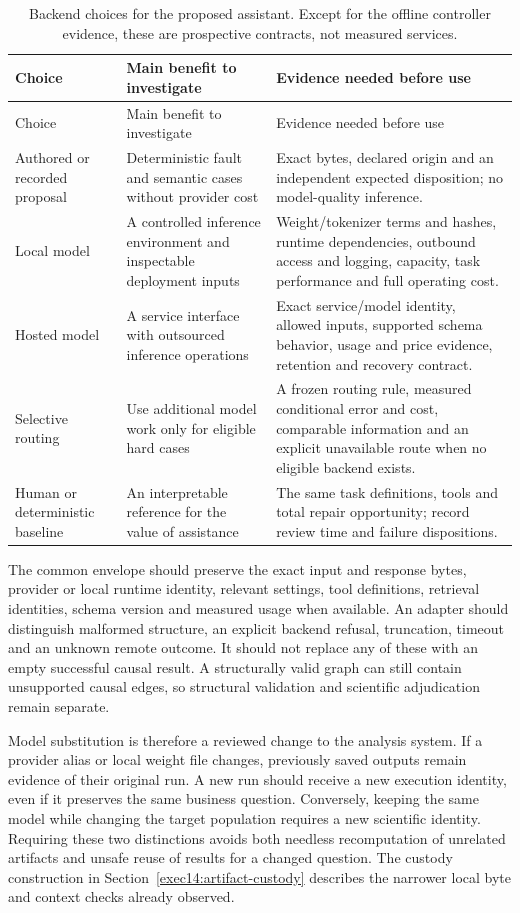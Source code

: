 \begin{longtable}{@{}P{.19\textwidth}P{.34\textwidth}P{.40\textwidth}@{}}
\caption{Backend choices for the proposed assistant. Except for the offline
controller evidence, these are prospective contracts, not measured services.}
\label{exec14:l6-backends}\\
\toprule Choice & Main benefit to investigate & Evidence needed before use\\\midrule
\endfirsthead
\toprule Choice & Main benefit to investigate & Evidence needed before use\\\midrule
\endhead
Authored or recorded proposal & Deterministic fault and semantic cases without
provider cost & Exact bytes, declared origin and an independent expected
disposition; no model-quality inference.\\
Local model & A controlled inference environment and inspectable deployment
inputs & Weight/tokenizer terms and hashes, runtime dependencies, outbound
access and logging, capacity, task performance and full operating cost.\\
Hosted model & A service interface with outsourced inference operations &
Exact service/model identity, allowed inputs, supported schema behavior,
usage and price evidence, retention and recovery contract.\\
Selective routing & Use additional model work only for eligible hard cases &
A frozen routing rule, measured conditional error and cost, comparable
information and an explicit unavailable route when no eligible backend exists.\\
Human or deterministic baseline & An interpretable reference for the value
of assistance & The same task definitions, tools and total repair opportunity;
record review time and failure dispositions.\\
\bottomrule
\end{longtable}

The common envelope should preserve the exact input and response bytes,
provider or local runtime identity, relevant settings, tool definitions,
retrieval identities, schema version and measured usage when available.
An adapter should distinguish malformed structure, an explicit backend
refusal, truncation, timeout and an unknown remote outcome. It should not
replace any of these with an empty successful causal result. A structurally
valid graph can still contain unsupported causal edges, so structural
validation and scientific adjudication remain separate.

Model substitution is therefore a reviewed change to the analysis system.
If a provider alias or local weight file changes, previously saved outputs
remain evidence of their original run. A new run should receive a new
execution identity, even if it preserves the same business question.
Conversely, keeping the same model while changing the target population
requires a new scientific identity. Requiring these two distinctions avoids
both needless recomputation of unrelated artifacts and unsafe reuse of
results for a changed question. The custody construction in
Section~\ref{exec14:artifact-custody} describes the narrower local byte and
context checks already observed.

